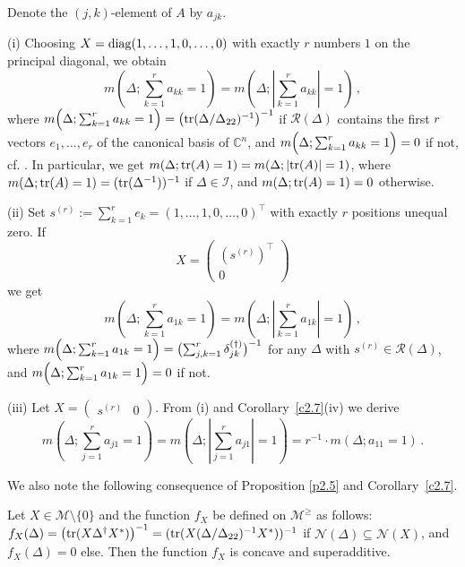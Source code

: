 \documentclass{amsart}
\begin{document}
\begin{exe} \label{e2.8}
 Denote the $(j,k)$-element of $A$ by $a_{jk}$.
 
(i) Choosing $X={\rm diag}(1,\ldots,1,0,\ldots,0)$ with exactly $r$ numbers $1$ on the principal diagonal, we obtain
\[ 
    m\left(\Delta; \sum_{k=1}^r a_{kk} = 1 \right) =  m\left(\Delta; \left|\sum_{k=1}^r a_{kk}\right| = 1 \right) \,  , 
\]
 where $m\Bigl(\Delta; \sum_{k=1}^r a_{kk} = 1 \Bigr) = \bigl({\rm tr}(\Delta/\Delta_{22})^{-1} \bigr)^{-1}$ if ${\mathcal R}(\Delta)$ contains the first $r$ vectors $e_1,\ldots,e_r$ of the canonical basis of ${\mathbb C}^n$, and $m\Bigl(\Delta; \sum_{k=1}^r a_{kk} = 1 \Bigr)  = 0$ if not, cf. \cite[Theorem~5.12]{A}. In particular, we get $m(\Delta; {\rm tr}(A )= 1) = m(\Delta; |{\rm tr}(A)| = 1)$, where $m(\Delta; {\rm tr}(A) = 1) = ({\rm tr}(\Delta^{-1}))^{-1}$ if $\Delta\in \mathcal I$, and $m(\Delta; {\rm tr}(A) = 1) = 0$ otherwise.

(ii) Set $s^{(r)}:=\sum_{k=1}^r e_k = (1,\ldots,1,0,\ldots,0)^\top$ with exactly $r$ positions unequal zero. If  
\[
    X=\left(\begin{array}{c} (s^{(r)})^{\top} \\ 0 \end{array}\right)
\]
we get
\[ 
   m\left(\Delta; \sum_{k=1}^r a_{1k} = 1 \right) =  m\left(\Delta; \left|\sum_{k=1}^r a_{1k}\right| = 1 \right)   \, , 
\]
where $m\Bigl(\Delta; \sum_{k=1}^r a_{1k} = 1 \Bigr)  = \bigl(  \sum_{j,k=1}^r \delta_{jk}^{(\dagger)}  \bigr)^{-1}$ for any $\Delta$ with $s^{(r)}\in {\mathcal R}(\Delta)$, and  $m\Bigl(\Delta; \sum_{k=1}^r a_{1k} = 1 \Bigr)  = 0$ if not.
 
(iii) Let  $X=\left(\begin{array}{cc} s^{(r)} & 0 \end{array}\right)$. From (i) and Corollary~\ref{c2.7}(iv) we derive
\[ 
    m\left(\Delta; \sum_{j=1}^r a_{j1} = 1 \right)  =  m\left(\Delta; \left|\sum_{j=1}^r a_{j1}\right| = 1 \right)  =  r^{-1} \cdot m\left(\Delta; a_{11} = 1 \right) \, .  
\]
\end{exe}

We also note the following consequence of Proposition \ref{p2.5} and Corollary~\ref{c2.7}.

\begin{cor} \label{c2.9}
     Let $X\in {\mathcal M}\setminus\{0\}$ and the function $f_X$ be defined on ${\mathcal M}^{\geq}$ as follows: $f_X(\Delta) = \bigl({\rm tr}(X\Delta^{\dagger}X^*) \bigr)^{-1}=({\rm tr}(X(\Delta / \Delta_{22})^{-1} X^*))^{-1}$ if ${\mathcal N}(\Delta) \subseteq {\mathcal N}(X)$, and $f_X(\Delta) = 0$ else. Then the function $f_X$ is concave and superadditive.
\end{cor}
\end{document}

